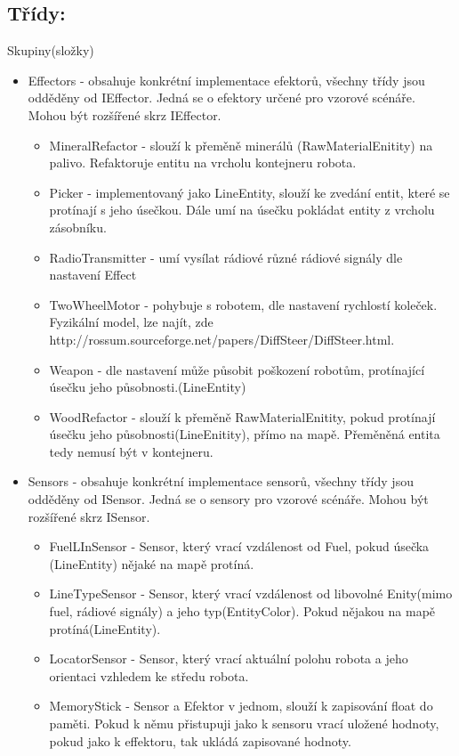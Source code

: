 \documentclass[12pt, oneside]{article}
\begin{document}
\subsection{Třídy:} 
Skupiny(složky) 
\begin{itemize}
\item Effectors
- obsahuje konkrétní implementace efektorů, všechny třídy jsou odděděny od IEffector. Jedná se o efektory určené pro vzorové scénáře. Mohou být rozšířené skrz IEffector. \\
\begin{itemize}
\item MineralRefactor - slouží k přeměně minerálů (RawMaterialEnitity) na palivo. Refaktoruje entitu na vrcholu kontejneru robota. 
\item Picker - implementovaný jako LineEntity, slouží ke zvedání entit, které se protínají s jeho úsečkou. Dále umí na úsečku pokládat entity z vrcholu zásobníku. 
\item RadioTransmitter - umí vysílat rádiové  různé rádiové signály dle nastavení Effect
\item TwoWheelMotor - pohybuje s robotem, dle nastavení rychlostí koleček. Fyzikální model, lze najít, zde  http://rossum.sourceforge.net/papers/DiffSteer/DiffSteer.html. 
\item Weapon - dle nastavení může působit poškození robotům, protínající úsečku jeho působnosti.(LineEntity) 
\item WoodRefactor - slouží k přeměně RawMaterialEnitity, pokud protínají úsečku jeho působnosti(LineEnitity), přímo na mapě. Přeměněná entita tedy nemusí být v kontejneru.
\end{itemize}
\item Sensors
- obsahuje konkrétní implementace sensorů, všechny třídy jsou  odděděny od ISensor. Jedná se o sensory pro vzorové scénáře. Mohou být rozšířené skrz ISensor.
\begin{itemize}
\item FuelLInSensor - Sensor, který vrací vzdálenost od Fuel, pokud úsečka (LineEntity) nějaké na mapě protíná.
\item LineTypeSensor - Sensor, který vrací vzdálenost od libovolné Enity(mimo fuel, rádiové signály) a jeho typ(EntityColor). Pokud nějakou na mapě protíná(LineEntity). 
\item LocatorSensor - Sensor, který vrací aktuální polohu robota a jeho orientaci vzhledem ke středu robota. 
\item MemoryStick - Sensor a Efektor v jednom, slouží k zapisování float do paměti. Pokud k němu přistupuji jako k sensoru vrací uložené hodnoty, pokud jako k effektoru, tak ukládá zapisované hodnoty. 

\end{itemize}
\end{itemize}
\end{document}
